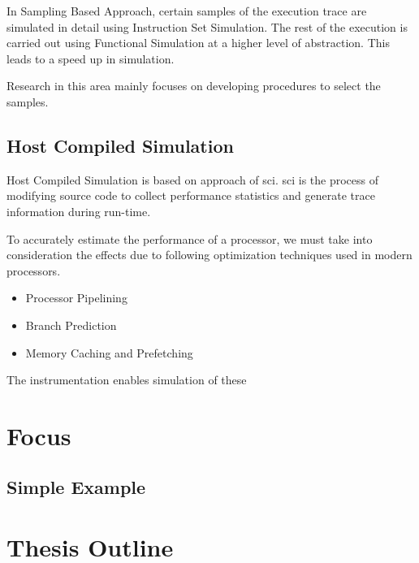 In Sampling Based Approach, certain samples of the execution trace are simulated in detail using Instruction Set Simulation. The rest of the execution is carried out using Functional Simulation at a higher level of abstraction. This leads to a speed up in simulation.

Research in this area mainly focuses on developing procedures to select the samples.


\subsection{Host Compiled Simulation}
Host Compiled Simulation is based on approach of \gls{sci}. \gls{sci} is the process of modifying source code to collect performance statistics and generate trace information during run-time. 

To accurately estimate the performance of a processor, we must take into consideration the effects due to following optimization techniques used in modern processors.
\begin{itemize} \itemsep -8pt
\item Processor Pipelining
\item Branch Prediction
\item Memory Caching and Prefetching
\end{itemize}
The instrumentation enables simulation of these

\section{Focus}

\subsection{Simple Example}

\section{Thesis Outline}